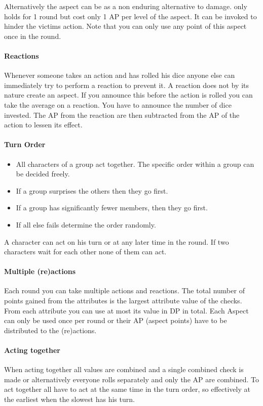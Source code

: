 \documentclass[11pt]{article}
\begin{document}
{Alternatively the aspect can be  as a non enduring alternative to damage.  only holds for 1 round but cost only 1 AP per level of the aspect. It can be invoked to hinder the victims action. Note that you can only use any point of this aspect once in the round. 
\paragraph*{Reactions}
\label{sec:org9931dde}
Whenever someone takes an action and has rolled his dice anyone else can immediately try to perform a reaction to prevent it. A reaction does not by its nature create an aspect. If you announce this before the action is rolled you can take the average on a reaction. You have to announce the number of dice invested. The AP from the reaction are then subtracted from the AP of the action to lessen its effect.
\paragraph*{Turn Order}
\label{sec:org3ea8f72}
\begin{itemize}
\item All characters of a group act together. The specific order within a group can be decided freely.
\item If a group surprises the others then they go first.
\item If a group has significantly fewer members, then they go first.
\item If all else fails determine the order randomly.
\end{itemize}

A character can act on his turn or at any later time in the round. If two characters wait for each other none of them can act.
\paragraph*{Multiple (re)actions}
\label{sec:orgf3c7961}
Each round you can take multiple actions and reactions. The total number of points gained from the attributes is the largest attribute value of the checks. From each attribute you can use at most its value in DP in total. Each Aspect can only be used once per round or their AP (aspect points) have to be distributed to the (re)actions.
\paragraph*{Acting together}
\label{sec:org44c7799}
When acting together all values are combined and a single combined check is made or alternatively everyone rolls separately and only the AP are combined. To act together all have to act at the same time in the turn order, so effectively at the earliest when the slowest has his turn.
}
\end{document}
